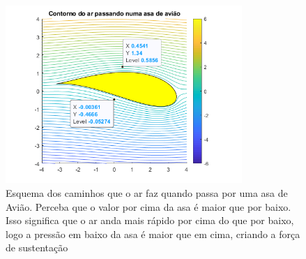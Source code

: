 \documentclass[12pt]{extarticle}
\newcommand{\<}{\langle}
\renewcommand{\>}{\rangle}
\theoremstyle{definition}
\begin{document}
\begin{figure}[H]
    \centering
    \includegraphics[width=0.8\textwidth]{asa_de_aviao.png}
    \caption{Esquema dos caminhos que o ar faz quando passa por uma asa de Avião. Perceba que o valor por cima da asa é maior que por baixo. Isso significa que o ar anda mais rápido por cima do que por baixo, logo a pressão em baixo da asa é maior que em cima, criando a força de sustentação}
    \label{fig:asa_aviao}
\end{figure}
\end{document}
